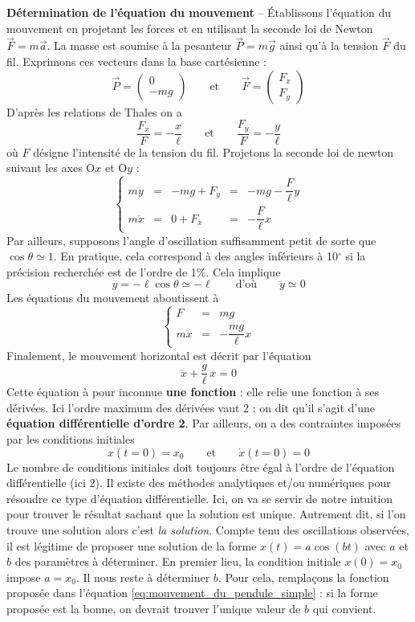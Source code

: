 \textbf{Détermination de l'équation du mouvement} -- Établissons l'équation du mouvement en projetant les forces et en utilisant la seconde loi de Newton $\overrightarrow{F}=m \overrightarrow{a}$. La masse est soumise à la pesanteur $\overrightarrow{P}=m \overrightarrow{g}$ ainsi qu'à la tension $\overrightarrow{F}$ du fil. Exprimons ces vecteurs dans la base cartésienne :
\[
\overrightarrow{P}=\begin{pmatrix}0\\-mg\end{pmatrix}
\qquad\text{et}\qquad
\overrightarrow{F}=\begin{pmatrix}F_x\\F_y\end{pmatrix}
\]
D'après les relations de Thales on a 
\[\dfrac{F_x}{F}=-\dfrac{x}{\ell}\qquad\text{et}\qquad\dfrac{F_y}{F}=-\dfrac{y}{\ell}	\]
où $F$ désigne l'intensité de la tension du fil. Projetons la seconde loi de newton suivant les axes O$x$ et O$y$ :
\[\left\{\begin{array}{rcccl}
m\ddot y	&=& -mg+F_y	&=& -mg-\dfrac{F}{\ell}y\\[3mm]
m\ddot x	&=& 0+F_x		&=& -\dfrac{F}{\ell}x
\end{array}\right.\]
Par ailleurs, supposons l'angle d'oscillation suffisamment petit de sorte que  $\cos\theta\simeq 1$. En pratique, cela  correspond à des angles inférieurs à 10\(^\circ\) si la précision recherchée est de l'ordre de 1\%. Cela implique 
\[y=-\ell\cos\theta\simeq -\ell  \qquad\text{d'où}\qquad \ddot y \simeq 0 \]
Les équations du mouvement aboutissent à 
\[\left\{\begin{array}{rcl}
F					&=&	mg\\[3mm]
m \ddot x	&=& -\dfrac{mg}{\ell}x
\end{array}	\right.\]
Finalement, le mouvement horizontal est décrit par l'équation 
\begin{equation}
	\ddot x+\frac{g}{\ell}\,x=0
	\label{eq:mouvement_du_pendule_simple}
\end{equation}
Cette équation à pour inconnue \textbf{une fonction} : elle relie une fonction à ses dérivées. Ici l'ordre maximum des dérivées vaut 2 ; on dit qu'il s'agit d'une \textbf{équation différentielle d'ordre 2}. Par ailleurs, on a des contraintes imposées par les conditions initiales 
\[	x(t=0)=x_0 \qquad\text{et}\qquad \dot x(t=0)=0\]
Le nombre de conditions initiales doit toujours être égal à l'ordre de l'équation différentielle (ici 2). Il existe des méthodes analytiques et/ou numériques pour résoudre ce type d'équation différentielle. Ici, on va se servir de notre intuition pour trouver le résultat sachant que la solution est unique. Autrement dit, si l'on trouve une solution alors c'est \emph{la solution}. Compte tenu des oscillations observées, il est légitime de  proposer une solution de la forme $x(t)=a\cos(bt)$ avec $a$ et $b$ des paramètres à déterminer. En premier lieu, la condition initiale $x(0)=x_0$ impose $a=x_0$. Il nous reste à déterminer $b$. Pour cela, remplaçons la  fonction proposée dans l'équation \eqref{eq:mouvement_du_pendule_simple} : si la forme proposée est la bonne, on devrait trouver l'unique valeur de $b$ qui convient.
